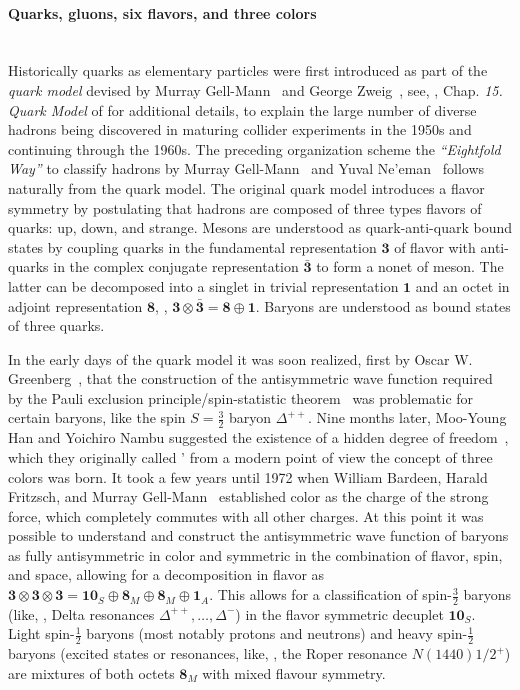 \paragraph{Quarks, gluons, six flavors, and three colors}\label{paragraph:qcdHistory}\mbox{}\\%
Historically quarks as elementary particles were first introduced as part of the \textit{quark model} devised by Murray Gell-Mann~\cite{Gell-Mann:1962yej} and George Zweig~\cite{Zweig:1964ruk,Zweig:1964jf}, see, \eg{}, Chap. \textit{15. Quark Model} of  for additional details, to explain the large number of diverse hadrons being discovered in maturing collider experiments in the 1950s and continuing through the 1960s.
The preceding organization scheme \dash{} the \textit{``Eightfold Way''}  \dash{} to classify hadrons by Murray Gell-Mann~\cite{GellMann:1961ky} and Yuval Ne’eman~\cite{Neeman1961Aug} follows naturally from the quark model.
The original quark model introduces a  flavor symmetry by postulating that hadrons are composed of three types \dash{} flavors \dash{} of quarks: up, down, and strange.
Mesons are understood as quark-anti-quark bound states by coupling quarks in the fundamental representation $\mathbf{3}$ of flavor  with anti-quarks in the complex conjugate representation $\mathbf{\bar{3}}$ to form a nonet of meson.
The latter can be decomposed into a singlet in trivial representation $\mathbf{1}$  and an octet in adjoint representation $\mathbf{8}$, \ie{}, $\mathbf{3}\otimes\mathbf{\bar{3}}=\mathbf{8}\oplus\mathbf{1}$.
Baryons are understood as bound states of three quarks.

In the early days of the quark model it was soon realized, first by Oscar W. Greenberg~\cite{Greenberg1964Nov}, that the construction of the antisymmetric wave function required by the Pauli exclusion principle/spin-statistic theorem~\cite{Pauli1925Feb,Pauli1925Feb2,Pauli1940Oct} was problematic for certain baryons, like the spin $S=\frac{3}{2}$ baryon $\Delta^{++}$.
Nine months later, Moo-Young Han and Yoichiro Nambu suggested the existence of a hidden degree of freedom~\cite{Han1965Aug}, which they originally called ' \dash{} from a modern point of view the concept of three colors was born.
It took a few years until 1972 when William Bardeen, Harald Fritzsch, and Murray Gell-Mann~\cite{Bardeen:1972xk} established color as the charge of the strong force, which completely commutes with all other charges.
At this point it was possible to understand and construct the antisymmetric wave function of baryons as fully antisymmetric in color and symmetric in the combination of flavor, spin, and space, allowing for a decomposition in flavor as $\mathbf{3}\otimes\mathbf{3}\otimes\mathbf{3}=\mathbf{10}_S\oplus\mathbf{8}_M\oplus\mathbf{8}_M\oplus\mathbf{1}_A$.
This allows for a classification of spin-$\frac{3}{2}$ baryons (like, \eg{}, Delta resonances ${\Delta^{++},\ldots,\Delta^{-}}$) in the flavor symmetric decuplet $\mathbf{10}_S$. 
Light spin-$\frac{1}{2}$ baryons (most notably protons and neutrons) and heavy spin-$\frac{1}{2}$ baryons (excited states or resonances, like, \eg{}, the Roper resonance ${N(1440)1/2^+}$) are mixtures of both octets $\mathbf{8}_M$ with mixed flavour symmetry.

